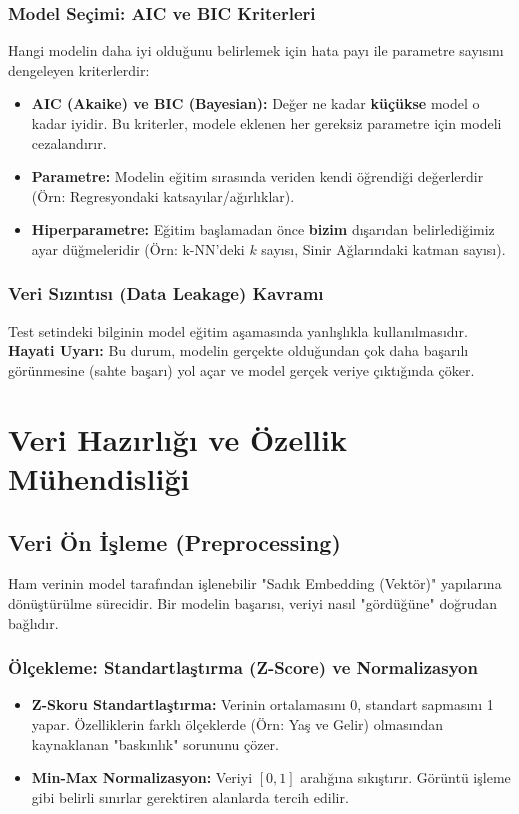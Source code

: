 \documentclass[12pt,a4paper]{article}
\begin{document}
\subsubsection{Model Seçimi: AIC ve BIC Kriterleri}
Hangi modelin daha iyi olduğunu belirlemek için hata payı ile parametre sayısını dengeleyen kriterlerdir:
\begin{itemize}
    \item \textbf{AIC (Akaike) ve BIC (Bayesian):} Değer ne kadar \textbf{küçükse} model o kadar iyidir. Bu kriterler, modele eklenen her gereksiz parametre için modeli cezalandırır.
\end{itemize}
\begin{itemize}
    \item \textbf{Parametre:} Modelin eğitim sırasında veriden kendi öğrendiği değerlerdir (Örn: Regresyondaki katsayılar/ağırlıklar).
    \item \textbf{Hiperparametre:} Eğitim başlamadan önce \textbf{bizim} dışarıdan belirlediğimiz ayar düğmeleridir (Örn: k-NN'deki $k$ sayısı, Sinir Ağlarındaki katman sayısı).
\end{itemize}

\subsubsection{Veri Sızıntısı (Data Leakage) Kavramı}
Test setindeki bilginin model eğitim aşamasında yanlışlıkla kullanılmasıdır. \textbf{Hayati Uyarı:} Bu durum, modelin gerçekte olduğundan çok daha başarılı görünmesine (sahte başarı) yol açar ve model gerçek veriye çıktığında çöker.

\newpage
\section{Veri Hazırlığı ve Özellik Mühendisliği}

\subsection{Veri Ön İşleme (Preprocessing)}
Ham verinin model tarafından işlenebilir "Sadık Embedding (Vektör)" yapılarına dönüştürülme sürecidir. Bir modelin başarısı, veriyi nasıl "gördüğüne" doğrudan bağlıdır.

\subsubsection{Ölçekleme: Standartlaştırma (Z-Score) ve Normalizasyon}
\begin{itemize}
    \item \textbf{Z-Skoru Standartlaştırma:} Verinin ortalamasını 0, standart sapmasını 1 yapar. Özelliklerin farklı ölçeklerde (Örn: Yaş ve Gelir) olmasından kaynaklanan "baskınlık" sorununu çözer.
    \item \textbf{Min-Max Normalizasyon:} Veriyi $[0, 1]$ aralığına sıkıştırır. Görüntü işleme gibi belirli sınırlar gerektiren alanlarda tercih edilir.
\end{itemize}
\end{document}
